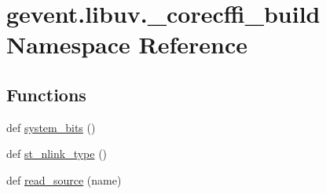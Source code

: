 \hypertarget{namespacegevent_1_1libuv_1_1__corecffi__build}{}\section{gevent.\+libuv.\+\_\+corecffi\+\_\+build Namespace Reference}
\label{namespacegevent_1_1libuv_1_1__corecffi__build}
\subsection*{Functions}
\begin{DoxyCompactItemize}
\item 
def \hyperlink{namespacegevent_1_1libuv_1_1__corecffi__build_a7633cfe158a9ff138c7aed70661bc1f7}{system\+\_\+bits} ()
\item 
def \hyperlink{namespacegevent_1_1libuv_1_1__corecffi__build_a70997cce9707dc9f6195fc320a2e7359}{st\+\_\+nlink\+\_\+type} ()
\item 
def \hyperlink{namespacegevent_1_1libuv_1_1__corecffi__build_a5007ffb4f61622e7371beac58144b5b3}{read\+\_\+source} (name)
\end{DoxyCompactItemize}
